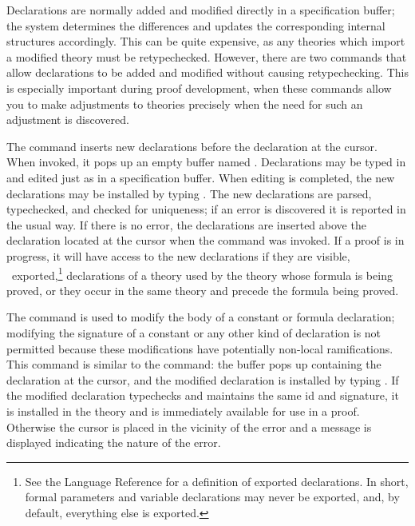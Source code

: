 Declarations are normally added and modified directly in a specification
buffer; the system determines the differences and updates the
corresponding internal structures accordingly.  This can be quite
expensive, as any theories which import a modified theory must be
retypechecked.  However, there are two commands that allow
declarations to be added and modified without causing retypechecking.
This is especially important during proof development, when these
commands allow you to make adjustments to theories precisely when
the need for such an adjustment is discovered.

The  command inserts new declarations before the
declaration at the cursor.  When invoked, it pops up an empty buffer named
.  Declarations may be typed in and edited just as
in a specification buffer.  When editing is completed, the new
declarations may be installed by typing .  The new
declarations are parsed, typechecked, and checked for uniqueness; if an
error is discovered it is reported in the usual way.  If there is no
error, the declarations are inserted above the declaration located at the
cursor when the  command was invoked.  If a proof is
in progress, it will have access to the new declarations if they are
visible, \ie\ exported,\footnote{See the Language Reference for a
definition of exported declarations.  In short, formal parameters and
variable declarations may never be exported, and, by default, everything
else is exported.} declarations of a theory used by the theory whose
formula is being proved, or they occur in the same theory and precede the
formula being proved.

The  command is used to modify the body of a
constant or formula declaration; modifying the signature of a constant or
any other kind of declaration is not permitted because these modifications
have potentially non-local ramifications.  This command is similar to the
 command: the  buffer pops
up containing the declaration at the cursor, and the modified declaration
is installed by typing .  If the modified declaration
typechecks and maintains the same id and signature, it is installed in the
theory and is immediately available for use in a proof.  Otherwise the
cursor is placed in the vicinity of the error and a message is displayed
indicating the nature of the error.

